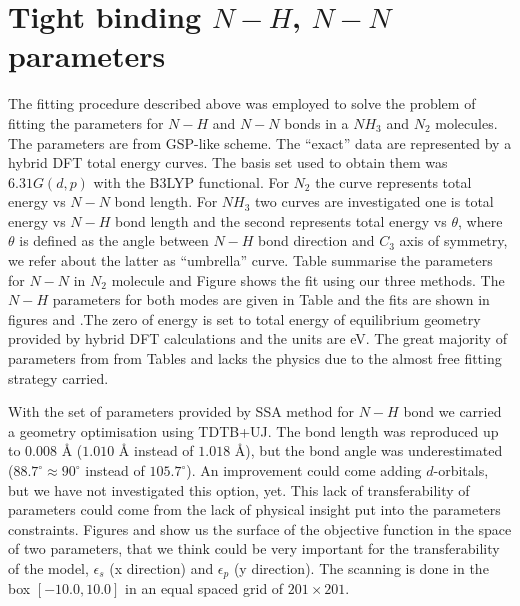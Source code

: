 \section{Tight binding $N-H$, $N-N$ parameters}
\par{The fitting procedure described above was employed to solve the problem of
fitting the parameters for $N-H$ and $N-N$ bonds in a $NH_3$ and $N_2$
molecules. The parameters are from GSP-like scheme. The ``exact'' data are
represented by a hybrid DFT total energy curves. The basis set used to obtain them
was $6.31G(d,p)$ with the B3LYP functional. For $N_2$ the curve represents total energy vs $N-N$ bond length. For $NH_3$
two curves are investigated one is total energy vs $N-H$ bond length and the
second represents total energy vs $\theta$, where $\theta$ is defined as the
angle between $N-H$ bond direction and $C_3$ axis of symmetry, we refer about
the latter as ``umbrella'' curve. Table  summarise the parameters
for $N-N$ in $N_2$ molecule and Figure  shows the fit using our three
methods. The $N-H$ parameters for both modes are given in Table 
and the fits are shown in figures  and .The zero
of energy is set to total energy of equilibrium geometry provided by hybrid
DFT calculations and the units are eV. The great majority of parameters from from Tables
 and  lacks the physics due to the almost free
fitting strategy carried.}
\par{With the set of parameters provided by SSA method for $N-H$ bond we carried a
geometry optimisation using TDTB+UJ. The bond length was reproduced up to 0.008
{\AA} ($1.010$ {\AA} instead of $1.018$ \AA), but the bond angle was
underestimated ($88.7^\circ \approx 90^\circ$ instead of $105.7^\circ$). An
improvement could come adding $d$-orbitals, but we have not investigated
this option, yet. This lack of transferability of parameters
could come from the lack of physical insight put into the parameters
constraints. Figures  and  show us the surface of
the objective function in the space of two parameters, that we think could be
very important for the transferability of the model, $\epsilon_s$ (x
direction) and $\epsilon_p$ (y direction). The scanning is done in the box
$[-10.0,10.0]$ in an equal spaced grid of $201\times 201$. }
%
